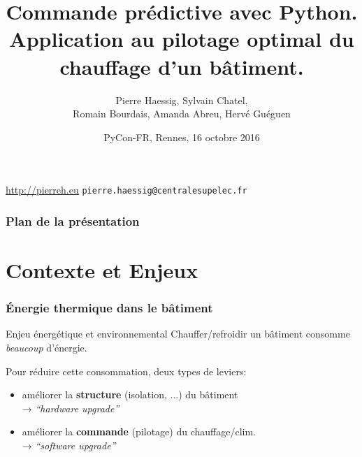

\title{Commande prédictive avec Python.\\
Application au pilotage optimal du chauffage d’un bâtiment.}

\author{Pierre Haessig, Sylvain Chatel, \\Romain Bourdais, Amanda Abreu, Hervé Guéguen}

\date{PyCon-FR, Rennes, 16 octobre 2016}



  \begin{frame}

  \titlepage

  \color{gray} \small
   \url{http://pierreh.eu}
   \hfill
   \texttt{pierre.haessig@centralesupelec.fr}

  \end{frame}

 \begin{frame}
   \frametitle{Plan de la présentation}

   \tableofcontents

 \end{frame}

\section{Contexte et Enjeux}

\begin{frame}[c]
  \frametitle{Énergie thermique dans le bâtiment}

  \begin{block}{Enjeu énergétique et environnemental}
    Chauffer/refroidir un bâtiment consomme \emph{beaucoup} d'énergie. %
  \end{block}

  \bigskip

  Pour réduire cette consommation, deux types de leviers:

  \begin{itemize}
    \item améliorer la \textbf{structure} (isolation, ...) du bâtiment\\
    → \emph{``hardware upgrade''}
    \pause
    \item améliorer la \textbf{commande} (pilotage) du chauffage/clim.\\
    → \emph{``software upgrade''}
  \end{itemize}

\end{frame}

